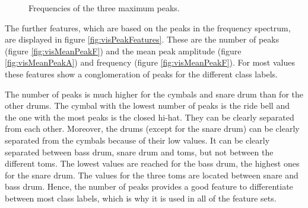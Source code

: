 \begin{figure}[tp]
	\centering
	\caption{Frequencies of the three maximum peaks.}
	\label{fig:visPeaksF}
\end{figure}


The further features, which are based on the peaks in the frequency spectrum, are displayed in figure \ref{fig:visPeakFeatures}. These are the number of peaks (figure \ref{fig:visMeanPeakF}) and the mean peak amplitude (figure \ref{fig:visMeanPeakA}) and frequency (figure \ref{fig:visMeanPeakF}). For most values these features show a conglomeration of peaks for the different class labels.

The number of peaks is much higher for the cymbals and snare drum than for the other drums. The cymbal with the lowest number of peaks is the ride bell and the one with the most peaks is the closed hi-hat. They can be clearly separated from each other. Moreover, the drums (except for the snare drum) can be clearly separated from the cymbals because of their low values. It can be clearly separated between bass drum, snare drum and toms, but not between the different toms. The lowest values are reached for the bass drum, the highest ones for the snare drum. The values for the three toms are located between snare and bass drum. Hence, the number of peaks provides a good feature to differentiate between most class labels, which is why it is used in all of the feature sets.

